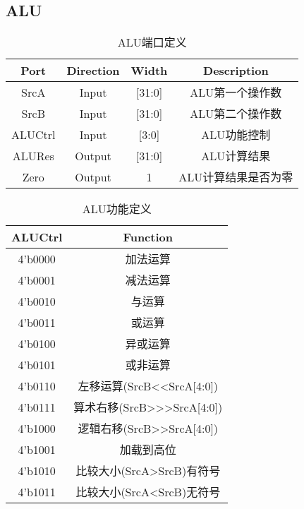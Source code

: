 \documentclass[UTF8]{ctexart}
\begin{document}
\subsection{ALU}
\begin{table}[H]
	\centering
	\begin{threeparttable}
		\caption{ALU端口定义}
		\begin{tabular}{cccc}
			\toprule
			\rowcolor{mypink}
			\textbf{Port} & \textbf{Direction} & \textbf{Width} & \textbf{Description} \\
			\midrule
			SrcA          & Input              & [31:0]         & ALU第一个操作数      \\
			\midrule
			SrcB          & Input              & [31:0]         & ALU第二个操作数      \\
			\midrule
			ALUCtrl       & Input              & [3:0]          & ALU功能控制          \\
			\midrule
			ALURes        & Output             & [31:0]         & ALU计算结果          \\
			\midrule
			Zero          & Output             & 1              & ALU计算结果是否为零  \\
			\midrule
		\end{tabular}
	\end{threeparttable}
\end{table}
\begin{table}[H]
	\centering
	\begin{threeparttable}
		\caption{ALU功能定义}
		\begin{tabular}{cc}
			\toprule
			\rowcolor{mypink}
			\textbf{ALUCtrl} & \textbf{Function}          \\
			\midrule
			4'b0000          & 加法运算                   \\
			\midrule
			4'b0001          & 减法运算                   \\
			\midrule
			4'b0010          & 与运算                     \\
			\midrule
			4'b0011          & 或运算                     \\
			\midrule
			4'b0100          & 异或运算                   \\
			\midrule
			4'b0101          & 或非运算                   \\
			\midrule
			4'b0110          & 左移运算(SrcB<<SrcA[4:0])  \\
			\midrule
			4'b0111          & 算术右移(SrcB>>>SrcA[4:0]) \\
			\midrule
			4'b1000          & 逻辑右移(SrcB>>SrcA[4:0])  \\
			\midrule
			4'b1001          & 加载到高位                 \\
			\midrule
			4'b1010          & 比较大小(SrcA>SrcB)有符号  \\
			\midrule
			4'b1011          & 比较大小(SrcA<SrcB)无符号  \\
			\midrule
		\end{tabular}
	\end{threeparttable}
\end{table}
\newpage
\end{document}
